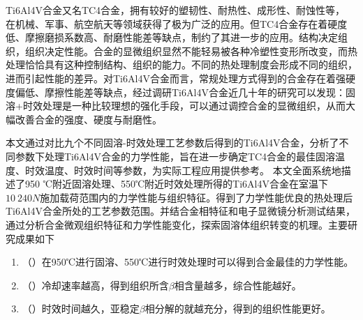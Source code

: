 \documentclass[
class = book,
zihao = -4,
font = noto,
paper = a4paper,
openany
]{easybook}
\newcommand{\ti}{Ti6Al4V}
\begin{document}
	\frontmatter*[roman]
	
	
	\setcounter{page}{2}
	\pagestyle{Xju}
	\begin{cnabstract}
	{\rmfamily
	\ti 合金又名TC4合金，拥有较好的塑韧性、耐热性、成形性、耐蚀性等，	在机械、军事、航空航天等领域获得了极为广泛的应用。但TC4合金存在着硬度低、摩擦磨损系数高、耐磨性能差等缺点，制约了其进一步的应用。结构决定组织，组织决定性能。合金的显微组织显然不能轻易被各种冷塑性变形所改变，而热处理恰恰具有这种控制结构、组织的能力。不同的热处理制度会形成不同的组织，进而引起性能的差异。对Ti6Al4V合金而言，常规处理方式得到的合金存在着强硬度偏低、摩擦性能差等缺点，经过调研\ti 合金近几十年的研究可以发现：固溶+时效处理是一种比较理想的强化手段，可以通过调控合金的显微组织，从而大幅改善合金的强度、硬度与耐磨性。

	本文通过对比九个不同固溶-时效处理工艺参数后得到的Ti6Al4V合金，分析了不同参数下处理Ti6Al4V合金的力学性能，旨在进一步确定TC4合金的最佳固溶温度、时效温度、时效时间等参数，为实际工程应用提供参考。 本文全面系统地描述了950 ℃附近固溶处理、550℃附近时效处理所得的Ti6Al4V合金在室温下$ 10~240 N $施加载荷范围内的力学性能与组织特征。得到了力学性能优良的热处理后\ti 合金所处的工艺参数范围。并结合金相特征和电子显微镜分析测试结果，通过分析合金微观组织特征和力学性能变化，探索固溶体组织转变的机理。主要研究成果如下
	\begin{enumerate}
		\item （）在950℃进行固溶、550℃进行时效处理时可以得到合金最佳的力学性能。
		\item （）冷却速率越高，得到组织所含$ \beta  $相含量越多，综合性能越好。
		\item （）时效时间越久，亚稳定$ \beta $相分解的就越充分，得到的组织性能更好。
	\end{enumerate}
	}
	\end{cnabstract}
\newpage
	\pagestyle{Xju}
\end{document}
